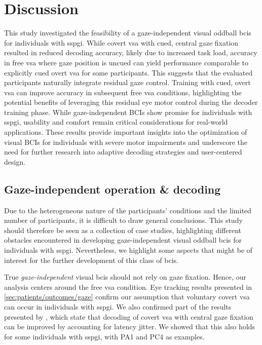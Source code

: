 \documentclass[twocolumn]{article}
\begin{document}
\section{Discussion}

This study investigated the feasibility of a gaze-independent visual oddball
\acp{bci} for individuals with \ac{sspgi}.
While covert \ac{vsa} with cued, central gaze fixation resulted in reduced decoding
accuracy, likely due to increased task load, accuracy in free \ac{vsa} where gaze position is uncued can
yield performance comparable to explicitly cued overt \ac{vsa} for some
participants.
This suggests that the evaluated participants naturally integrate residual gaze control.
Training with cued, overt \ac{vsa} can improve accuracy in subsequent free \ac{vsa} conditions,
highlighting the potential benefits of leveraging this residual eye motor control
during the decoder training phase.
While gaze-independent BCIs show promise for individuals with \ac{sspgi},
usability and comfort remain critical considerations for real-world applications.
These results provide important insights into the optimization of visual BCIs for individuals with severe motor impairments and underscore the need for further research into adaptive decoding strategies and user-centered design.

\subsection{Gaze-independent operation \& decoding}
Due to the heterogeneous nature of the participants' conditions and the limited
number of participants, it is difficult to draw general conclusions.
This study should therefore be seen as a collection of case studies,
highlighting different obstacles encountered in developing gaze-independent
visual oddball \acp{bci} for individuals with \ac{sspgi}.
Nevertheless, we highlight some aspects that might be
of interest for the further development of this class of \acp{bci}.

True \emph{gaze-independent} visual \acp{bci} should not rely on gaze fixation.
Hence, our analysis centers around the free \ac{vsa} condition.
Eye tracking results presented in \cref{sec:patients/outcomes/gaze}
confirm our assumption that voluntary covert \ac{vsa} can
occur in individuals with \ac{sspgi}.
We also confirmed part of the results presented by \textcite{VanDenKerchove2024},
which state that decoding of covert \ac{vsa} with central gaze
fixation can be improved by accounting for latency jitter. We showed that this
also holds for some individuals with \ac{sspgi}, with PA1 and PC4 as examples.
\end{document}
